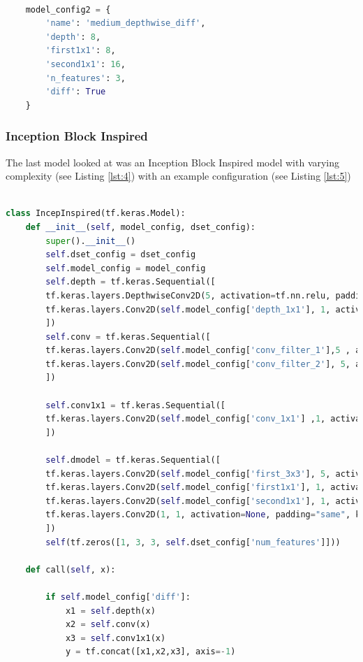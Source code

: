 \begin{lstlisting}[language=Python, label={lst:3}]

	model_config2 = {
		'name': 'medium_depthwise_diff',
		'depth': 8,
		'first1x1': 8,
		'second1x1': 16,
		'n_features': 3,
		'diff': True
	}

\end{lstlisting}
\subsubsection*{Inception Block Inspired}
The last model looked at was an Inception Block Inspired model with  varying complexity (see Listing \ref{lst:4}) with an example configuration (see Listing \ref{lst:5})

\begin{lstlisting}[language=Python, label={lst:4}]
	
class IncepInspired(tf.keras.Model):
	def __init__(self, model_config, dset_config):
		super().__init__()
		self.dset_config = dset_config
		self.model_config = model_config
		self.depth = tf.keras.Sequential([
		tf.keras.layers.DepthwiseConv2D(5, activation=tf.nn.relu, padding="same", depth_multiplier=self.model_config['depth']),
		tf.keras.layers.Conv2D(self.model_config['depth_1x1'], 1, activation=tf.nn.relu, padding="same")
		])
		self.conv = tf.keras.Sequential([
		tf.keras.layers.Conv2D(self.model_config['conv_filter_1'],5 , activation=tf.nn.relu, padding="same"),
		tf.keras.layers.Conv2D(self.model_config['conv_filter_2'], 5, activation=tf.nn.relu, padding="same"),
		])
		
		self.conv1x1 = tf.keras.Sequential([
		tf.keras.layers.Conv2D(self.model_config['conv_1x1'] ,1, activation=tf.nn.relu, padding="same"),
		])
		
		self.dmodel = tf.keras.Sequential([
		tf.keras.layers.Conv2D(self.model_config['first_3x3'], 5, activation=tf.nn.relu, padding="same"),
		tf.keras.layers.Conv2D(self.model_config['first1x1'], 1, activation=tf.nn.relu, padding="same"),
		tf.keras.layers.Conv2D(self.model_config['second1x1'], 1, activation=tf.nn.relu, padding="same"),
		tf.keras.layers.Conv2D(1, 1, activation=None, padding="same", kernel_initializer=tf.zeros_initializer)
		])
		self(tf.zeros([1, 3, 3, self.dset_config['num_features']]))
	
	def call(self, x):
	
		if self.model_config['diff']:
			x1 = self.depth(x)
			x2 = self.conv(x)
			x3 = self.conv1x1(x)
			y = tf.concat([x1,x2,x3], axis=-1)
			

\end{lstlisting}
